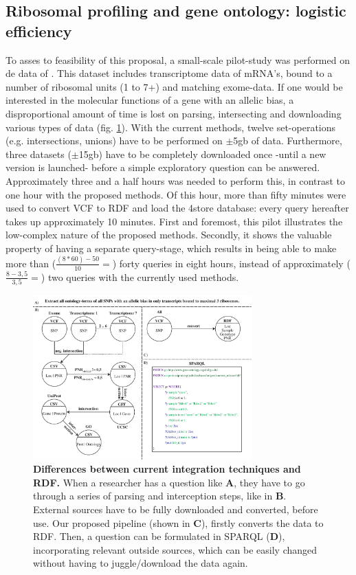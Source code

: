 \documentclass[twoside,fontsize=12pt]{article}
\begin{document}
\subsection*{Ribosomal profiling and gene ontology: logistic efficiency}
To asses to feasibility of this proposal, a small-scale pilot-study was performed on de data of \citet{VanHeesch2014}. This dataset includes transcriptome data of mRNA's, bound to a number of ribosomal units (1 to 7+) and matching exome-data. If one would be interested in the molecular functions of a gene with an allelic bias, a disproportional amount of time is lost on parsing, intersecting and downloading various types of data (fig. \ref{fig:awesome_image}). With the current methods, twelve set-operations (e.g. intersections, unions) have to be performed on $\pm$5gb of data. Furthermore, three datasets ($\pm$15gb) have to be completely downloaded once -until a new version is launched- before a simple exploratory question can be answered. Approximately three and a half hours was needed to perform this, in contrast to one hour with the proposed methods. Of this hour, more than fifty minutes were used to convert VCF to RDF and load the 4store database: every query hereafter takes up approximately 10 minutes. First and foremost, this pilot illustrates the low-complex nature of the proposed methods. Secondly, it shows the valuable property of having a separate query-stage, which results in being able to make more than ($\frac{(8*60)-50}{10}= $) forty queries in eight hours, instead of approximately ($\frac{8-3,5}{3,5}= $) two queries with the currently used methods.
\begin{figure}[h!]
    \centering
    \includegraphics[width=0.75\textwidth]{DifferencesInDoingThings}
    \caption{\textbf{Differences between current integration techniques and RDF.} When a researcher has a question like \textbf{A}, they have to go through a series of parsing and interception steps, like in \textbf{B}. External sources have to be fully downloaded and converted, before use. Our proposed pipeline (shown in \textbf{C}), firstly converts the data to RDF. Then, a question can be formulated in SPARQL (\textbf{D}), incorporating relevant outside sources, which can be easily changed without having to juggle/download the data again.}
    \label{fig:awesome_image}
\end{figure}
\end{document}

